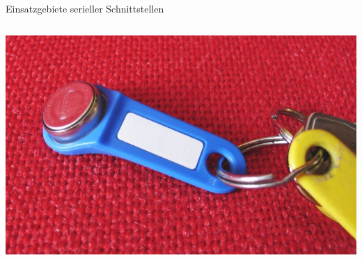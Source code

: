 \begin{frame}{Einsatzgebiete serieller Schnittstellen}
\begin{columns}
        \includegraphics[width=\textwidth]{2-hardwaredesign/img/seriell_einsatz3}
    \end{columns}
\end{frame}
